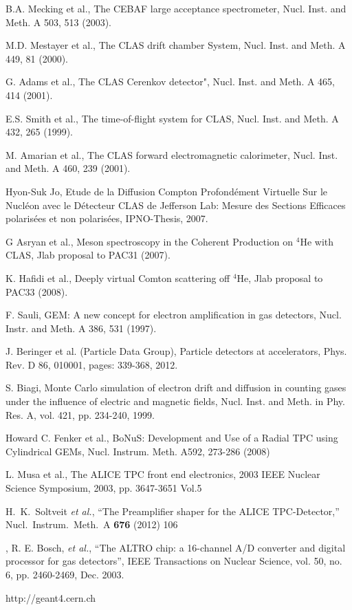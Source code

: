 \documentclass[twocolumn,showpacs,superscriptaddress,groupedaddress]{revtex4}
\begin{document}
\begin{thebibliography}{99}

   B.A. Mecking et al., The CEBAF large acceptance spectrometer, Nucl. Inst. 
   and Meth. A 503, 513 (2003).

   M.D. Mestayer et al., The CLAS drift chamber System, Nucl. Inst.  and Meth.  
   A 449, 81 (2000).

   G. Adams et al., The CLAS Cerenkov detector", Nucl. Inst. and Meth. A 465, 
   414 (2001).

   E.S. Smith et al., The time-of-flight system for CLAS, Nucl.  Inst. and 
   Meth. A 432, 265 (1999).

   M. Amarian et al., The CLAS forward electromagnetic calorimeter, Nucl.  
   Inst. and Meth. A 460, 239 (2001). 

   Hyon-Suk Jo, Etude de la Diffusion Compton Profond{\'e}ment Virtuelle Sur le 
   Nucl{\'e}on avec le D{\'e}tecteur CLAS de Jefferson Lab: Mesure des Sections 
   Efficaces polaris{\'e}es et non polaris{\'e}es, IPNO-Thesis, 2007.

   G Asryan et al., Meson spectroscopy in the Coherent Production on $^{4}$He with CLAS, Jlab 
   proposal to PAC31 (2007).

   K. Hafidi et al., Deeply virtual Comton scattering off $^{4}$He, Jlab 
   proposal to PAC33 (2008).

   F. Sauli, GEM: A new concept for electron amplification in gas detectors, 
   Nucl. Instr. and Meth. A 386, 531 (1997).

   J. Beringer et al. (Particle Data Group), Particle detectors at 
   accelerators, Phys. Rev. D 86, 010001, pages: 339-368, 2012.

   S. Biagi, Monte Carlo simulation of electron drift and diffusion in counting 
   gases under the influence of electric and magnetic fields, Nucl.  Inst. and 
   Meth. in Phy. Res. A, vol. 421, pp. 234-240, 1999.

   Howard C. Fenker et al., BoNuS: Development and Use of a Radial TPC using 
   Cylindrical GEMs, Nucl. Instrum. Meth. A592, 273-286 (2008)

 L. Musa et al., The ALICE TPC front end electronics, 2003 IEEE Nuclear 
 Science Symposium, 2003, pp. 3647-3651 Vol.5
 
   H.~K.~Soltveit {\it et al.},
   ``The Preamplifier shaper for the ALICE TPC-Detector,''
   Nucl.\ Instrum.\ Meth.\ A {\bf 676} (2012) 106
 
 ,
 R. E. Bosch, {\it et al.}, ``The ALTRO chip: a 16-channel A/D converter and 
 digital processor for gas detectors'', IEEE Transactions on Nuclear Science, 
 vol. 50, no. 6, pp. 2460-2469, Dec. 2003.

http://geant4.cern.ch
 	

\end{thebibliography}
\end{document}
